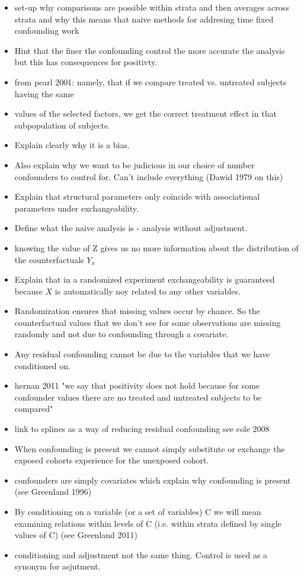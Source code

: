 \documentclass[11pt]{article}
\providecommand{\tightlist}{%
      \setlength{\itemsep}{0pt}\setlength{\parskip}{0pt}}
\begin{document}
\begin{itemize}
\tightlist
\item
  set-up why comparisons are possible within strata and then averages
  across strata and why this means that naive methods for addresing time
  fixed confounding work
\item
  Hint that the finer the confounding control the more accurate the
  analysis but this has consequences for positivty.
\item
  from pearl 2001: namely, that if we compare treated vs. untreated
  subjects having the same
\item
  values of the selected factors, we get the correct treatment effect in
  that subpopulation of subjects.
\item
  Explain clearly why it is a bias.
\item
  Also explain why we want to be judicious in our choice of number
  confounders to control for. Can't include everything (Dawid 1979 on
  this)
\item
  Explain that structural parameters only coincide with associational
  parameters under exchangeability.
\item
  Define what the naive analysis is - analysis without adjustment.
\item
  knowing the value of Z gives us no more information about the
  distribution of the counterfactuals \(Y_x\)
\item
  Explain that in a randomized experiment exchangeability is guaranteed
  because \(X\) is automatically noy related to any other variables.
\item
  Randomization ensures that missing values occur by chance. So the
  counterfactual values that we don't see for some observations are
  missing randomly and not due to confounding through a covariate.
\item
  Any residual confounding cannot be due to the variables that we have
  conditioned on.
\item
  hernan 2011 "we say that positivity does not hold because for some
  confounder values there are no treated and untreated subjects to be
  compared"
\item
  link to splines as a way of reducing residual confounding see cole
  2008
\item
  When confounding is present we cannot simply substitute or exchange
  the exposed cohorts experience for the unexposed cohort.
\item
  confounders are simply covariates which explain why confounding is
  present (see Greenland 1996)
\item
  By conditioning on a variable (or a set of variables) C we will mean
  examining relations within levels of C (i.e. within strata defined by
  single values of C) (see Greenland 2011)
\item
  conditioning and adjustment not the same thing. Control is used as a
  synonym for asjutment.
\end{itemize}
\end{document}
